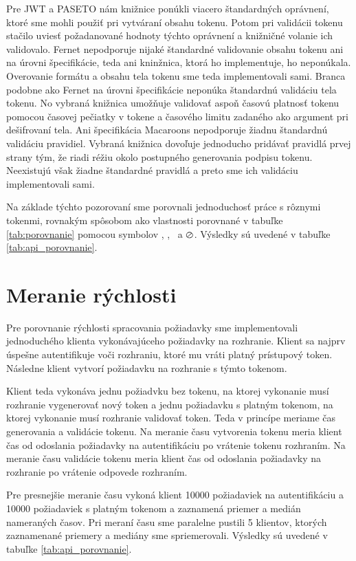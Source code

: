 Pre JWT a PASETO nám knižnice ponúkli viacero štandardných oprávnení, ktoré sme mohli použiť pri vytváraní obsahu tokenu. Potom pri validácii tokenu stačilo uviesť požadanované hodnoty týchto oprávnení a knižničné volanie ich validovalo. Fernet nepodporuje nijaké štandardné validovanie obsahu tokenu ani na úrovni špecifikácie, teda ani kninžnica, ktorá ho implementuje, ho neponúkala. Overovanie formátu a obsahu tela tokenu sme teda implementovali sami. Branca podobne ako Fernet na úrovni špecifikácie neponúka štandardnú validáciu tela tokenu. No vybraná knižnica umožňuje validovať aspoň časovú platnosť tokenu pomocou časovej pečiatky v tokene a časového limitu zadaného ako argument pri dešifrovaní tela. Ani špecifikácia Macaroons nepodporuje žiadnu štandardnú validáciu pravidiel. Vybraná knižnica dovoľuje jednoducho pridávať pravidlá prvej strany tým, že riadi réžiu okolo postupného generovania podpisu tokenu. Neexistujú však žiadne štandardné pravidlá a preto sme ich validáciu implementovali sami.

Na základe týchto pozorovaní sme porovnali jednoduchosť práce s rôznymi tokenmi, rovnakým spôsobom ako vlastnosti porovnané v tabuľke \ref{tab:porovnanie} pomocou symbolov \CIRCLE, \LEFTcircle, \Circle ~a $\varoslash$. Výsledky sú uvedené v tabuľke \ref{tab:api_porovnanie}.

\section{Meranie rýchlosti}

Pre porovnanie rýchlosti spracovania požiadavky sme implementovali jednoduchého klienta vykonávajúceho požiadavky na rozhranie. Klient sa najprv úspešne autentifikuje voči rozhraniu, ktoré mu vráti platný prístupový token. Následne klient vytvorí požiadavku na rozhranie s týmto tokenom.

Klient teda vykonáva jednu požiadvku bez tokenu, na ktorej vykonanie musí rozhranie vygenerovať nový token a jednu požiadavku s platným tokenom, na ktorej vykonanie musí rozhranie validovať token. Teda v princípe meriame čas generovania a validácie tokenu. Na meranie času vytvorenia tokenu meria klient čas od odoslania požiadavky na autentifikáciu po vrátenie tokenu rozhraním. Na meranie času validácie tokenu meria klient čas od odoslania požiadavky na rozhranie po vrátenie odpovede rozhraním.

Pre presnejšie meranie času vykoná klient 10000 požiadaviek na autentifikáciu a 10000 požiadaviek s platným tokenom a zaznamená priemer a medián nameraných časov. Pri meraní času sme paralelne pustili 5 klientov, ktorých zaznamenané priemery a mediány sme spriemerovali. Výsledky sú uvedené v tabuľke \ref{tab:api_porovnanie}.

